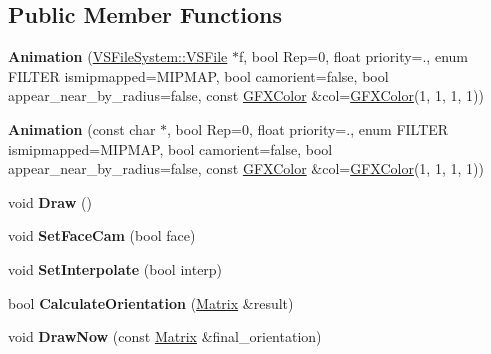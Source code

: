 \subsection*{Public Member Functions}
\begin{DoxyCompactItemize}
\item 
{\bfseries Animation} (\hyperlink{classVSFileSystem_1_1VSFile}{V\+S\+File\+System\+::\+V\+S\+File} $\ast$f, bool Rep=0, float priority=., enum F\+I\+L\+T\+ER ismipmapped=M\+I\+P\+M\+AP, bool camorient=false, bool appear\+\_\+near\+\_\+by\+\_\+radius=false, const \hyperlink{structGFXColor}{G\+F\+X\+Color} \&col=\hyperlink{structGFXColor}{G\+F\+X\+Color}(1, 1, 1, 1))\hypertarget{classAnimation_a1f8bed06ba7b54aa27f302fadd5e690d}{}\label{classAnimation_a1f8bed06ba7b54aa27f302fadd5e690d}

\item 
{\bfseries Animation} (const char $\ast$, bool Rep=0, float priority=., enum F\+I\+L\+T\+ER ismipmapped=M\+I\+P\+M\+AP, bool camorient=false, bool appear\+\_\+near\+\_\+by\+\_\+radius=false, const \hyperlink{structGFXColor}{G\+F\+X\+Color} \&col=\hyperlink{structGFXColor}{G\+F\+X\+Color}(1, 1, 1, 1))\hypertarget{classAnimation_abda07a4a066899801020e014b02b7acd}{}\label{classAnimation_abda07a4a066899801020e014b02b7acd}

\item 
void {\bfseries Draw} ()\hypertarget{classAnimation_a708aaadcc89b683ae349666cbe9e27df}{}\label{classAnimation_a708aaadcc89b683ae349666cbe9e27df}

\item 
void {\bfseries Set\+Face\+Cam} (bool face)\hypertarget{classAnimation_ae6f7a577f9be5f531d7ac799ce8ba960}{}\label{classAnimation_ae6f7a577f9be5f531d7ac799ce8ba960}

\item 
void {\bfseries Set\+Interpolate} (bool interp)\hypertarget{classAnimation_ac73eff7ff26a2269b636d3f7d129402a}{}\label{classAnimation_ac73eff7ff26a2269b636d3f7d129402a}

\item 
bool {\bfseries Calculate\+Orientation} (\hyperlink{classMatrix}{Matrix} \&result)\hypertarget{classAnimation_a1c5d290bc76c761ed4edc6787db90eb5}{}\label{classAnimation_a1c5d290bc76c761ed4edc6787db90eb5}

\item 
void {\bfseries Draw\+Now} (const \hyperlink{classMatrix}{Matrix} \&final\+\_\+orientation)\hypertarget{classAnimation_aec7c3f5f295780a1640f721868e3288c}{}\label{classAnimation_aec7c3f5f295780a1640f721868e3288c}


\end{DoxyCompactItemize}

